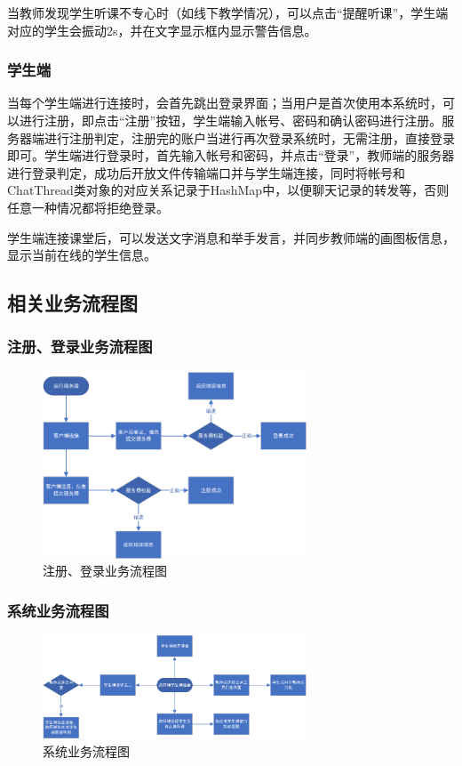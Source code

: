 \documentclass[UTF8,12pt]{article}
\begin{document}
当教师发现学生听课不专心时（如线下教学情况），可以点击“提醒听课”，学生端对应的学生会振动2s，并在文字显示框内显示警告信息。
\subsubsection{学生端}
当每个学生端进行连接时，会首先跳出登录界面；当用户是首次使用本系统时，可以进行注册，即点击“注册”按钮，学生端输入帐号、密码和确认密码进行注册。服务器端进行注册判定，注册完的账户当进行再次登录系统时，无需注册，直接登录即可。学生端进行登录时，首先输入帐号和密码，并点击“登录”，教师端的服务器进行登录判定，成功后开放文件传输端口并与学生端连接，同时将帐号和ChatThread类对象的对应关系记录于HashMap中，以便聊天记录的转发等，否则任意一种情况都将拒绝登录。

学生端连接课堂后，可以发送文字消息和举手发言，并同步教师端的画图板信息，显示当前在线的学生信息。

\subsection{相关业务流程图}
\subsubsection{注册、登录业务流程图}
\begin{figure}[htbp]
    \centering
    \includegraphics[width=0.7\textwidth]{img/29.png}
    \caption{注册、登录业务流程图}
\end{figure}

\subsubsection{系统业务流程图}
\begin{figure}[htbp]
    \centering
    \includegraphics[width=0.7\textwidth]{img/30.png}
    \caption{系统业务流程图}
\end{figure}
\end{document}
